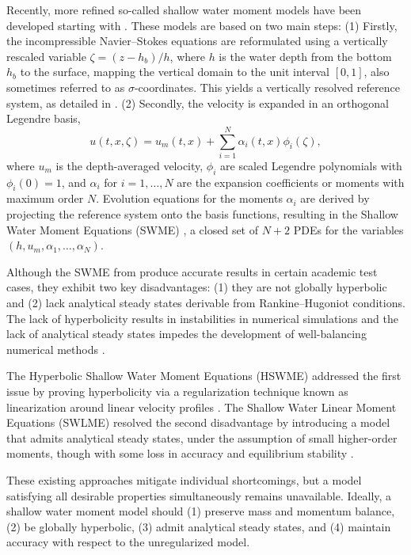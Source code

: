 \documentclass[a4paper, 11pt]{article}
\begin{document}
Recently, more refined so-called shallow water moment models have been developed starting with \cite{Kowalski2019}. These models are based on two main steps: (1) Firstly, the incompressible Navier–Stokes equations are reformulated using a vertically rescaled variable $\zeta = (z - h_b)/h$, where $h$ is the water depth from the bottom $h_b$ to the surface, mapping the vertical domain to the unit interval $[0,1]$, also sometimes referred to as $\sigma$-coordinates. This yields a vertically resolved reference system, as detailed in \cite{Kowalski2019}. (2) Secondly, the velocity is expanded in an orthogonal Legendre basis,
\begin{equation}
    u(t, x, \zeta) = u_m(t, x) + \sum_{i=1}^{N} \alpha_i(t, x) \phi_i(\zeta),
\end{equation}
where $u_m$ is the depth-averaged velocity, $\phi_i$ are scaled Legendre polynomials with $\phi_i(0) = 1$, and $\alpha_i$ for $i=1, \ldots, N$ are the expansion coefficients or moments with maximum order $N$. Evolution equations for the moments $\alpha_i$ are derived by projecting the reference system onto the basis functions, resulting in the Shallow Water Moment Equations (SWME) \cite{Kowalski2019}, a closed set of $N+2$ PDEs for the variables $(h, u_m, \alpha_1, \ldots, \alpha_N)$.

Although the SWME from \cite{Kowalski2019} produce accurate results in certain academic test cases, they exhibit two key disadvantages: (1) they are not globally hyperbolic and (2) lack analytical steady states derivable from Rankine–Hugoniot conditions. The lack of hyperbolicity results in instabilities in numerical simulations \cite{Koellermeier2020c} and the lack of analytical steady states impedes the development of well-balancing numerical methods \cite{Cao2022}.

The Hyperbolic Shallow Water Moment Equations (HSWME) addressed the first issue by proving hyperbolicity via a regularization technique known as linearization around linear velocity profiles \cite{Koellermeier2020c}. The Shallow Water Linear Moment Equations (SWLME) \cite{Koellermeier2020i} resolved the second disadvantage by introducing a model that admits analytical steady states, under the assumption of small higher-order moments, though with some loss in accuracy and equilibrium stability \cite{Huang2022}.

These existing approaches mitigate individual shortcomings, but a model satisfying all desirable properties simultaneously remains unavailable. Ideally, a shallow water moment model should (1) preserve mass and momentum balance, (2) be globally hyperbolic, (3) admit analytical steady states, and (4) maintain accuracy with respect to the unregularized model.
\end{document}
